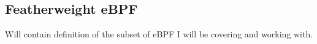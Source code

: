 \subsection{Featherweight eBPF}
\label{subsec:featherweight_ebpf}
Will contain definition of the subset of eBPF I will be covering and working with.

